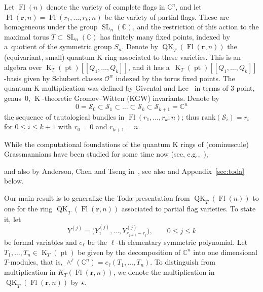 \documentclass[11pt]{article}
\numberwithin{equation}{section}
\numberwithin{equation}{section}
\theoremstyle{definition}
\DeclareMathOperator{\SL}{SL}
\DeclareMathOperator{\Fl}{Fl}
\DeclareMathOperator{\QK}{QK}
\DeclareMathOperator{\K}{K}
\DeclareMathOperator{\pt}{pt}
\newcommand{\bfr}{{\mathbf r}}
\newcommand{\C}{{\mathbb C}}
\newcommand{\cO}{{\mathcal O}}
\newcommand{\cS}{{\mathcal S}}
\begin{document}
Let $\Fl(n)$ denote the variety of complete flags in $\C^n$, and let
$\Fl(\bfr,n)=\Fl(r_1, \dots, r_k; n)$ be the variety of partial flags. These are homogeneous under the group
$\SL_n(\C)$, and the restriction of this action to the maximal torus
$T \subset \SL_n(\C)$ has finitely many fixed points, indexed
by a~quotient of the symmetric group $S_n$.
Denote
by $\QK_T(\Fl(\bfr,n))$ the (equivariant, small) quantum K
ring associated to these varieties. This is an algebra over
$\K_T(\pt)[\![Q_1, \dots, Q_k]\!]$, and it has
a~$\K_T(\pt)[\![Q_1, \dots, Q_k]\!]$-basis given by Schubert classes
$\cO^w$ indexed by the torus fixed points. The quantum K multiplication
was defined by Givental and Lee~\cite{givental:onwdvv,lee:QK} in
terms of $3$-point, genus~$0$, $\K$-theoretic Gromov--Witten (KGW) invariants.
Denote by
\[ 0=\cS_0 \subset \cS_1 \subset \dots \subset \cS_k \subset \cS_{k+1}=\C^n \]
the sequence of tautological bundles in $\Fl(r_1, \dots, r_k; n)$; thus
$\mathrm{rank}(\cS_i)=r_i$ for $0\leq i\leq k+1$ with $r_0=0$ and $r_{k+1}=n$.

While the computational foundations of the quantum K rings
of (cominuscule) Grassmannians have been studied for some
time now (see, e.g.,~\cite{BCMP:qkpos,BCMP:qkchev,buch.m:qk,chaput.perrin:rationality,Gorbounov:2014,sinha2024quantum}),


and also by Anderson, Chen and Tseng in~\cite{act:2017}, see also
\cite{koroteev} and Appendix~\ref{sec:toda} below.

Our main result is to generalize the Toda presentation from $\QK_T(\Fl(n))$
to one for the ring
$\QK_T(\Fl(\bfr,n))$ associated to partial flag varieties. To state it, let
\[
Y^{(j)}=\bigl(Y^{(j)}_1,\dots,{ Y^{(j)}_{r_{j+1}-r_j}}\bigr), \qquad 0\leq j\leq k
\]
be formal variables and $e_\ell$ be the $\ell$-th elementary symmetric polynomial. Let $T_1,\dots, T_n \in \K_T(\pt)$ be given by
the decomposition of $\C^n$ into one dimensional $T$-modules, that is, $\wedge^\ell(\C^n)=e_\ell(T_1,\dots,T_n)$. To distinguish from multiplication in $K_T(\Fl(\bfr,n))$, we denote the multiplication in $\QK_T(\Fl(\bfr,n))$ by $\star$.
\end{document}
